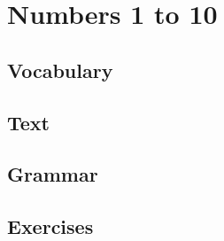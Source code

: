 \chapter{Numbers 1 to 10}
\section*{Vocabulary}
\section*{Text}
\section*{Grammar}
\section*{Exercises}
